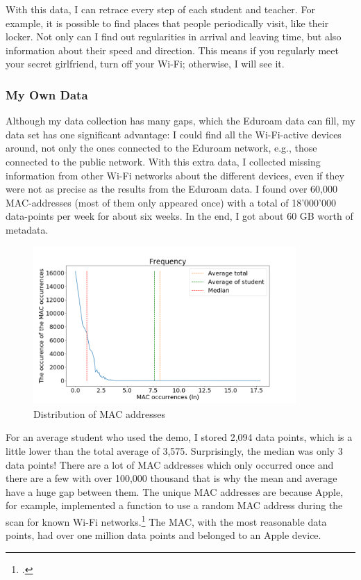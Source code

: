 \documentclass[paper=a4, fontsize=11pt]{article}
\begin{document}
With this data, I can retrace every step of each student and teacher. For example, it is possible to find places that people periodically visit, like their locker. Not only can I find out regularities in arrival and leaving time, but also information about their speed and direction. This means if you regularly meet your secret girlfriend, turn off your Wi-Fi; otherwise, I will see it.



\subsubsection{My Own Data}

Although my data collection has many gaps, which the Eduroam data can fill, my data set has one significant advantage: I could find all the Wi-Fi-active devices around, not only the ones connected to the Eduroam network, e.g., those connected to the public network. With this extra data,  I collected missing information from other Wi-Fi networks about the different devices, even if they were not as precise as the results from the Eduroam data. I found over 60,000 MAC-addresses (most of them only appeared once) with a total of 18'000'000 data-points per week for about six weeks. In the end, I got about 60 GB worth of metadata.

\begin{figure}
\centering
\includegraphics [width = 10cm, height = 6cm]{images/maccounter4.png}
\caption{Distribution of MAC addresses \label{usernames}}
\end{figure}

For an average student who used the demo, I stored 2,094 data points, which is a little lower than the total average of 3,575. Surprisingly, the median was only 3 data points! There are a lot of MAC addresses which only occurred once and there are a few with over 100,000 thousand  that is why the mean and average have a huge gap between them. The unique MAC addresses are because Apple, for example, implemented a function to use a random MAC address during the scan for known Wi-Fi networks.\footcite{applerandom}
The MAC, with the most reasonable data points, had over one million data points and belonged to an Apple device.
\end{document}
